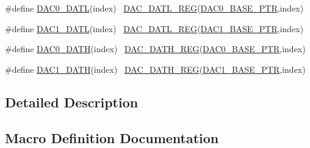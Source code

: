 \begin{DoxyCompactItemize}
\item 
\#define \hyperlink{group___d_a_c___register___accessor___macros_gad1e226ca5378cccb3032a3e65ee3aabd}{D\+A\+C0\+\_\+\+D\+A\+TL}(index)                                              ~\hyperlink{group___d_a_c___register___accessor___macros_gabf321758d2caebaf297aed5907b1bb5d}{D\+A\+C\+\_\+\+D\+A\+T\+L\+\_\+\+R\+EG}(\hyperlink{group___d_a_c___peripheral_gabe3b30df06ec04e5c899efd6e49f1800}{D\+A\+C0\+\_\+\+B\+A\+S\+E\+\_\+\+P\+TR},index)
\item 
\#define \hyperlink{group___d_a_c___register___accessor___macros_ga1f9628b3cb6c5c9111065c256a88f8d5}{D\+A\+C1\+\_\+\+D\+A\+TL}(index)                                              ~\hyperlink{group___d_a_c___register___accessor___macros_gabf321758d2caebaf297aed5907b1bb5d}{D\+A\+C\+\_\+\+D\+A\+T\+L\+\_\+\+R\+EG}(\hyperlink{group___d_a_c___peripheral_gab3af24d21edf756c3f794c52b5789847}{D\+A\+C1\+\_\+\+B\+A\+S\+E\+\_\+\+P\+TR},index)
\item 
\#define \hyperlink{group___d_a_c___register___accessor___macros_gab4d4a155e15a18015eddcab55644a588}{D\+A\+C0\+\_\+\+D\+A\+TH}(index)                                              ~\hyperlink{group___d_a_c___register___accessor___macros_ga2993d3474a391b72469826f58317edc9}{D\+A\+C\+\_\+\+D\+A\+T\+H\+\_\+\+R\+EG}(\hyperlink{group___d_a_c___peripheral_gabe3b30df06ec04e5c899efd6e49f1800}{D\+A\+C0\+\_\+\+B\+A\+S\+E\+\_\+\+P\+TR},index)
\item 
\#define \hyperlink{group___d_a_c___register___accessor___macros_ga053b7c88283d47e7ce95a9f04b4affe3}{D\+A\+C1\+\_\+\+D\+A\+TH}(index)                                              ~\hyperlink{group___d_a_c___register___accessor___macros_ga2993d3474a391b72469826f58317edc9}{D\+A\+C\+\_\+\+D\+A\+T\+H\+\_\+\+R\+EG}(\hyperlink{group___d_a_c___peripheral_gab3af24d21edf756c3f794c52b5789847}{D\+A\+C1\+\_\+\+B\+A\+S\+E\+\_\+\+P\+TR},index)
\end{DoxyCompactItemize}


\subsection{Detailed Description}


\subsection{Macro Definition Documentation}
